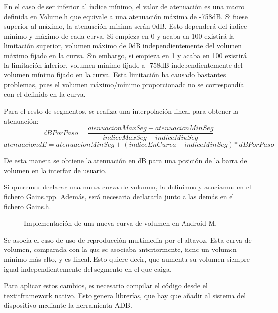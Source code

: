 En el caso de ser inferior al índice mínimo, el valor de atenuación es una macro definida en Volume.h que equivale a una atenuación máxima de -758\gls{dB}. Si fuese superior al máximo, la atenuación mínima serán 0\gls{dB}. Esto dependerá del índice mínimo y máximo de cada curva. Si empieza en 0 y acaba en 100 existirá la limitación superior, volumen máximo de 0\gls{dB} independientemente del volumen máximo fijado en la curva. Sin embargo, si empieza en 1 y acaba en 100 existirá la limitación inferior, volumen mínimo fijado a -758\gls{dB} independientemente del volumen mínimo fijado en la curva. Esta limitación ha causado bastantes problemas, pues el volumen máximo/mínimo proporcionado no se correspondía con el definido en la curva.

Para el resto de segmentos, se realiza una interpolación lineal para obtener la atenuación:
\begin{equation}
dBPorPaso=\frac{atenuacionMaxSeg-atenuacionMinSeg}{indiceMaxSeg-indiceMinSeg}
\end{equation}
\begin{equation}\label{ec:atenuaciondB}
atenuaciondB=atenuacionMinSeg+(indiceEnCurva-indiceMinSeg)*dBPorPaso
\end{equation}

De esta manera se obtiene la atenuación en \gls{dB} para una posición de la barra de volumen en la interfaz de usuario.

Si queremos declarar una nueva curva de volumen, la definimos y asociamos en el fichero Gains.cpp. Además, será necesaria declararla junto a las demás en el fichero Gains.h.

\begin{figure}[H]
	\centering
	\caption{Implementación de una nueva curva de volumen en Android M.} \label{fig:curva_propia}
\end{figure}

Se asocia el caso de uso de reproducción multimedia por el altavoz. Esta curva de volumen, comparada con la que se asociaba anteriormente, tiene un volumen mínimo más alto, y es lineal. Esto quiere decir, que aumenta su volumen siempre igual independientemente del segmento en el que caiga.

Para aplicar estos cambios, es necesario compilar el código desde el textit{framework} nativo. Esto genera librerías, que hay que añadir al sistema del dispositivo mediante la herramienta \gls{ADB}. 


